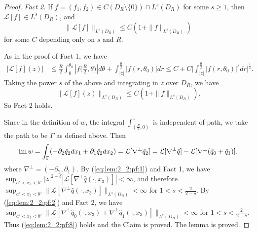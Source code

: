 \documentclass[12pt]{article}
\newcommand{\Imagine}{{\rm Im \hspace{0.05cm} }}
\begin{document}
\begin{proof}
	\noindent\emph{Fact 2.} If $f=(f_1, f_2)\in C(D_R\setminus\{0\})\cap L^s(D_R)$ for some $s\ge 1$, then $\mathcal{L}[f]\in L^s(D_R)$, and 
	\[
		\|\mathcal{L}[f]\|_{L^s(D_R)}\le C(1+\|f\|_{L^{s}(D_R)}) 
	\]
	for some $C$ depending only on $s$ and $R$. 
	
	As in the proof of Fact 1, we have 
	\[
	\begin{split}
		|\mathcal{L}[f](z)| & \le \frac{R}{2}\int_{0}^{\theta_0}|f\big(\frac{R}{2}, \theta\big)|d\theta 
		+\int_{|z|}^{\frac{R}{2}}|f(r, \theta_0)|dr
		\le C+C\big|\int_{|z|}^{\frac{R}{2}}|f(r, \theta_0)|^sdr\big|^{\frac{1}{s}}. 
	\end{split}
	\]
	Taking the power $s$ of the above and integrating in $z$ over $D_R$, we have 
	\[
		\|\mathcal{L}[f](z)\|_{L^s(D_R)}\le C(1+\|f\|_{L^{s}(D_R)}). 
	\]
	So Fact 2 holds. 
	
	Since in the definition of $w$, the integral $\int_{(\frac{R}{2}, 0)}^{z}$ is independent of path, we take the path to be $\Gamma$ as defined above. Then 
	\[
		\Imagine w=\int_{\Gamma}(-\partial_2\hat{q}_2 dx_1+\partial_1\hat{q}_2dx_2)=\mathcal{L}[\nabla^{\perp}\hat{q}_2]=\mathcal{L}[\nabla^{\perp}\hat{q}]-\mathcal{L}[\nabla^{\perp}(\hat{q}_0+\hat{q}_1)].
	\]
	where $\nabla^{\perp}=(-\partial_2, \partial_1)$. By (\ref{eq:lem:2_2:pf:1}) and Fact 1, we have $\sup_{a'<x_3<b'}|z|^{2-\delta}|\mathcal{L}[\nabla^{\perp}\hat{q}(\cdot, x_3)]|<\infty$, and therefore $\sup_{a'<x_3<b'} \|\mathcal{L}[\nabla^{\perp}\hat{q}(\cdot, x_3)]\|_{L^{s}(D_{R})}<\infty$ for $1<s<\frac{2}{2-\delta}$. By (\ref{eq:lem:2_2:pf:2}) and Fact 2, we have $\sup_{a'<x_3<b'} \|\mathcal{L}[\nabla^{\perp}\hat{q}_0(\cdot, x_3)+\nabla^{\perp}\hat{q}_1(\cdot, x_3)]\|_{L^{s}(D_{R})}<\infty$ for $1<s<\frac{2}{2-\delta}$. Thus (\ref{eq:lem:2_2:pf:8}) holds and the Claim is proved. The lemma is proved. 
\end{proof}
\end{document}
